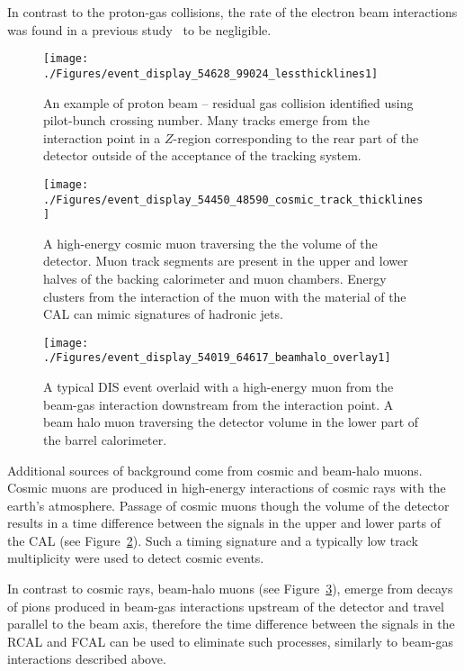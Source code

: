 In contrast to the proton-gas collisions, the rate of the electron beam interactions was found in a previous study~\cite{thesis:moritz:2001} to be negligible.

\begin{figure}[ht]
	\centering
	\texttt{[image: ./Figures/event\_display\_54628\_99024\_lessthicklines1]} 
	\caption{An example of proton beam -- residual gas collision identified using pilot-bunch crossing number. Many tracks emerge from the interaction point in a $Z$-region corresponding to the rear part of the \zeus detector outside of the acceptance of the tracking system.}
	\label{fig:beamgaseventdisplay}
\end{figure}

\begin{figure}[htbp]
	\centering
	\texttt{[image: ./Figures/event\_display\_54450\_48590\_cosmic\_track\_thicklines]} 
	\caption{A high-energy cosmic muon traversing the the volume of the \zeus detector. Muon track segments are present in the upper and lower halves of the backing calorimeter and muon chambers. Energy clusters from the interaction of the muon with the material of the CAL can mimic signatures of hadronic jets.}
	\label{fig:cosmiceventdisplay}
\end{figure}

\begin{figure}[htbp!]
	\centering
	\texttt{[image: ./Figures/event\_display\_54019\_64617\_beamhalo\_overlay1]} 
	\caption{A typical DIS event overlaid with a high-energy muon from the beam-gas interaction downstream from the interaction point. A beam halo muon traversing the detector volume in the lower part of the barrel calorimeter.}
	\label{fig:beamhaloeventdisplay}
\end{figure}

Additional sources of background come from cosmic and beam-halo muons. Cosmic muons are produced in high-energy interactions of cosmic rays with the earth's atmosphere. Passage of cosmic muons though the volume of the detector results in a time difference between the signals in the upper and lower parts of the CAL (see Figure~\ref{fig:cosmiceventdisplay}). Such a timing signature and a typically low track multiplicity were used to detect cosmic events. 

In contrast to cosmic rays, beam-halo muons (see Figure~\ref{fig:beamhaloeventdisplay}), emerge from decays of pions produced in beam-gas interactions upstream of the detector and travel parallel to the beam axis, therefore the time difference between the signals in the RCAL and FCAL can be used to eliminate such processes, similarly to beam-gas interactions described above. 

